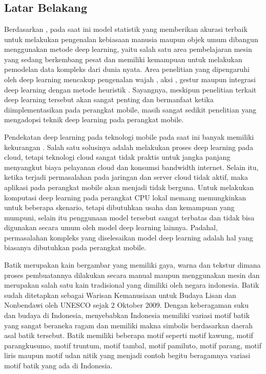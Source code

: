 \chapter{\babSatu}

\section{Latar Belakang}
Berdasarkan \cite{deepx}, pada saat ini model statistik yang memberikan akurasi terbaik untuk melakukan pengenalan kebiasaan manusia maupun objek umum dibangun menggunakan metode deep learning, yaitu salah satu area pembelajaran mesin yang sedang berkembang pesat dan  memiliki kemampuan untuk melakukan pemodelan data kompleks dari dunia nyata. Area penelitian yang dipengaruhi oleh deep learning mencakup pengenalan wajah \cite{face_occlusion}, aksi \cite{har_mocap_fnn}, gestur \cite{hand_gesture} maupun integrasi deep learning dengan metode heuristik \cite{meta_cnn}. Sayangnya, meskipun penelitian terkait deep learning tersebut akan sangat penting dan bermanfaat ketika diimplementasikan pada perangkat mobile, masih sangat sedikit penelitian yang mengadopsi teknik deep learning pada perangkat mobile.

Pendekatan deep learning pada teknologi mobile pada saat ini banyak memiliki kekurangan \cite{deepx}. Salah satu solusinya adalah melakukan proses deep learning pada cloud, tetapi teknologi cloud sangat tidak praktis untuk jangka panjang menyangkut biaya pelayanan cloud dan konsumsi bandwidth internet. Selain itu, ketika terjadi permasalahan pada jaringan dan server cloud tidak aktif, maka aplikasi pada perangkat mobile akan menjadi tidak berguna. Untuk melakukan komputasi deep learning pada perangkat CPU lokal memang memungkinkan untuk beberapa skenario, tetapi dibutuhkan usaha dan kemampuan yang mumpuni, selain itu penggunaan model tersebut sangat terbatas dan tidak bisa digunakan secara umum oleh model deep learning lainnya. Padahal, permasalahan kompleks yang diselesaikan model deep learning adalah hal yang biasanya dibutuhkan pada perangkat mobile.

Batik merupakan kain bergambar yang memiliki gaya, warna dan tekstur dimana proses pembuatannya dilakukan secara manual maupun menggunakan mesin dan merupakan salah satu kain tradisional yang dimiliki oleh negara indonesia. Batik sudah ditetapkan sebagai Warisan Kemanusiaan untuk Budaya Lisan dan Nonbendawi oleh UNESCO sejak 2 Oktober 2009. Dengan keberagaman suku dan budaya di Indonesia, menyebabkan Indonesia memiliki variasi motif batik yang sangat beraneka ragam dan memiliki makna simbolis berdasarkan daerah asal batik tersebut. Batik memiliki beberapa motif seperti motif kawung, motif parangkusumo, motif truntum, motif tambal, motif pamiluto, motif parang, motif liris maupun motif udan nitik yang menjadi contoh begitu beragamnya variasi motif batik yang ada di Indonesia.

